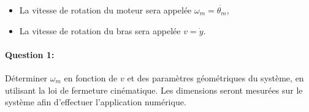 \begin{itemize}
 \item La vitesse de rotation du moteur sera appelée $\omega_m=\dot{\theta_m}$,
 \item La vitesse de rotation du bras sera appelée $v=\dot{y}$.
\end{itemize}

\paragraph{Question 1:} Déterminer $\omega_m$ en fonction de $v$ et des paramètres géométriques du système, en utilisant la loi de fermeture cinématique. Les dimensions seront mesurées sur le système afin d'effectuer l'application numérique.

%
%
%
%
%

